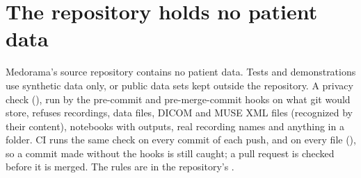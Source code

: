 \section{The repository holds no patient data}
\label{sec:protecting-repository}

Medorama's source repository contains no patient data. Tests and demonstrations use synthetic
data only, or public data sets kept outside the repository. A privacy check
(), run by the pre-commit and pre-merge-commit hooks on what
git would store, refuses recordings, data files, DICOM and MUSE XML files (recognized by their
content), notebooks with outputs, real recording names and anything in a 
folder. CI runs the same check on every commit of each push, and on every file
(), so a commit made without the hooks is still caught; a
pull request is checked before it is merged. The rules are in the repository's .
